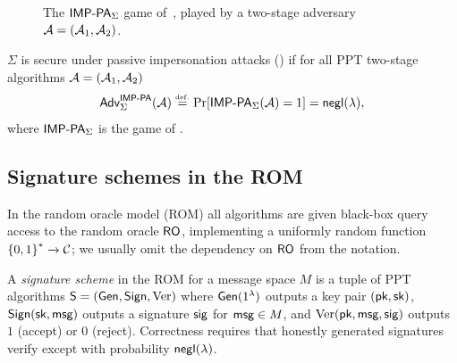 \begin{figure}[htb]
    \centering
    \begin{pchstack}
        \pchspace
    \end{pchstack}
    \caption{The $\mathsf{IMP}\text{-}\mathsf{PA}_\Sigma$ game of~\cite[Game~1]{C:ABDPW25}, played by a
        two-stage adversary $\mathcal{A} = (\mathcal{A}_1, \mathcal{A}_2)$.}\label{fig:imppa}
\end{figure}

\begin{definition}\label{def:imppa}
    $\Sigma$ is secure under passive impersonation attacks (\IMPPA) if for all
    PPT two-stage algorithms $\mathcal{A} = (\mathcal{A}_1, \mathcal{A}_2)$
    \begin{equation}
        \mathsf{Adv}^{\mathsf{IMP}\text{-}\mathsf{PA}}_{\Sigma}(\mathcal{A}) \overset{\scriptscriptstyle\mathrm{def.}}{=} \Pr[\mathsf{IMP}\text{-}\mathsf{PA}_\Sigma(\mathcal{A}) = 1]
        = \mathsf{negl}(\lambda),
    \end{equation}
    where $\mathsf{IMP}\text{-}\mathsf{PA}_\Sigma$ is the game of .
\end{definition}

\subsection{Signature schemes in the ROM}\label{sec:sig-rom}

In the random oracle model (ROM) all algorithms are given black-box query access
to the random oracle $\mathsf{RO}$, implementing a uniformly random function
$\left\{0,1\right\}^* \xrightarrow{} \mathcal{C}$; we usually omit the dependency on $\mathsf{RO}$ from the
notation.

\begin{definition}\label{def:sigscheme}
    A \emph{signature scheme} in the ROM for a message space $M$ is a tuple of
    PPT algorithms $\mathsf{S} = (\operatorname{\mathsf{Gen}}, \mathsf{Sign}, \operatorname{Ver})$ where $\operatorname{\mathsf{Gen}}(1^{\lambda})$
    outputs a key pair $(\textsf{pk}, \textsf{sk})$, $\mathsf{Sign}(\textsf{sk}, \textsf{msg})$ outputs a signature
    $\mathsf{sig}$ for $\textsf{msg} \in M$, and $\operatorname{Ver}(\textsf{pk}, \textsf{msg}, \mathsf{sig})$ outputs $1$ (accept) or
    $0$ (reject).
    Correctness requires that honestly generated signatures verify except with
    probability $\mathsf{negl}(\lambda)$.
\end{definition}

